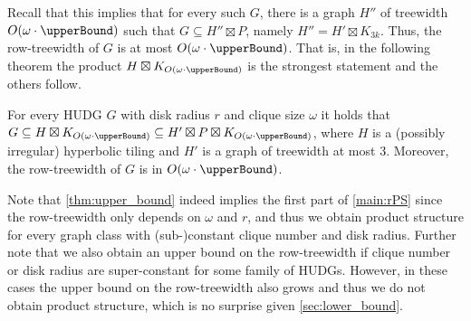Recall that this implies that for every such $ G $, there is a graph $ H'' $ of treewidth $ O(\omega \cdot \upperBound) $ such that $ G \subseteq H'' \boxtimes P $, namely $ H'' = H' \boxtimes K_{3k} $.
Thus, the row-treewidth of $ G $ is at most $ O(\omega \cdot \upperBound) $.
That is, in the following theorem the product $ H \boxtimes K_{O(\omega \cdot \upperBound)} $ is the strongest statement and the others follow.
%
\begin{theorem}\label{thm:upper_bound}
    For every HUDG $ G $ with disk radius $ r $ and clique size $ \omega $ it holds that $ G \subseteq H \boxtimes K_{O(\omega \cdot \upperBound)} \subseteq H' \boxtimes P \boxtimes K_{O(\omega \cdot \upperBound)}$, where $ H $ is a (possibly irregular) hyperbolic tiling and $ H' $ is a graph of treewidth at most $ 3 $.
    Moreover, the row-treewidth of $ G $ is in $ O(\omega \cdot \upperBound) $.
\end{theorem}
%
Note that \cref{thm:upper_bound} indeed implies the first part of \cref{main:rPS}
since the row-treewidth only depends on $ \omega $ and $ r $, and thus we obtain product structure for every graph class with (sub-)constant clique number and disk radius.
Further note that we also obtain an upper bound on the row-treewidth if clique number or disk radius are super-constant for some family of HUDGs.
However, in these cases the upper bound on the row-treewidth also grows and thus we do not obtain product structure, which is no surprise given \cref{sec:lower_bound}.
%

